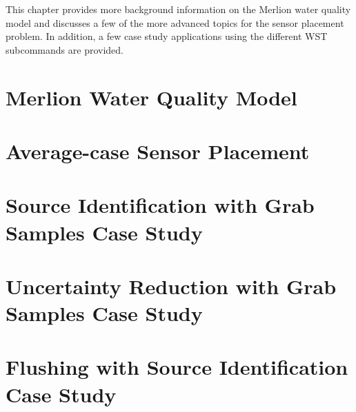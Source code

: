 This chapter provides more background information on the Merlion 
water quality model and discusses a few of the more advanced topics 
for the sensor placement problem. In addition, a few case study applications 
using the different WST subcommands are provided.

\section{Merlion Water Quality Model}\label{appendixMerlion} 

\newpage

\section{Average-case Sensor Placement}\label{chap:pmedian} 

\newpage

%

\section{Source Identification with Grab Samples Case Study}\label{chap:inversionCase} 

\newpage

\section{Uncertainty Reduction with Grab Samples Case Study}\label{chap:samplingCase} 

\newpage

\newpage
\section{Flushing with Source Identification Case Study}\label{chap:flushCase} 

\newpage

